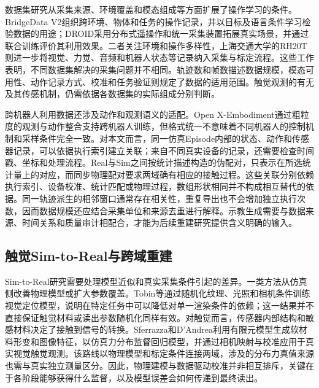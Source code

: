 数据集研究从采集来源、环境覆盖和模态组成等方面扩展了操作学习的条件。BridgeData V2组织跨环境、物体和任务的操作记录，并以目标及语言条件学习检验数据的用途\cite{walke2023bridgedata}；DROID采用分布式遥操作和统一采集装置拓展真实场景，并通过联合训练评价其利用效果\cite{khazatsky2024droid}。二者关注环境和操作多样性，上海交通大学的RH20T则进一步将视觉、力觉、音频和机器人状态等记录纳入采集与标定流程\cite{fang2024rh20t}。这些工作表明，不同数据集解决的采集问题并不相同。轨迹数和帧数描述数据规模，模态可用性、动作记录方式、校准和任务验证则规定了数据的适用范围。触觉观测的有无及其传感机制，仍需依据各数据集的实际组成分别判断。

跨机器人利用数据还涉及动作和观测语义的适配。Open X-Embodiment通过粗粒度的观测与动作整合支持跨机器人训练，但格式统一不意味着不同机器人的控制机制和采样条件完全一致\cite{openx2024embodiment}。对本文而言，同一仿真Episode内部的状态、动作和传感器记录，可以依据执行索引建立关联；来自不同真实设备的记录，还需要检查时间戳、坐标和处理流程。Real与Sim之间按统计描述构造的伪配对，只表示在所选统计量上的对应，而同步物理配对要求两域确有相应的接触过程。这些关联分别依赖执行索引、设备校准、统计匹配或物理过程，数组形状相同并不构成相互替代的依据。同一轨迹派生的相邻窗口通常存在相关性，重复导出也不会增加独立执行次数，因而数据规模还应结合采集单位和来源去重进行解释。示教生成需要与数据来源、时间关系和质量审计相配合，才能为后续重建研究提供含义明确的输入。

\subsection{触觉Sim-to-Real与跨域重建}
\label{subsec:tactile_sim_to_real}

Sim-to-Real研究需要处理模型近似和真实采集条件引起的差异。一类方法从仿真侧改善物理模型或扩大参数覆盖。Tobin等通过随机化纹理、光照和相机条件训练视觉定位模型，说明在特定任务中可以降低对单一渲染条件的依赖\cite{tobin2017randomization}；这一结果并不直接保证触觉材料或读出参数随机化同样有效。对触觉而言，传感器内部结构和敏感材料决定了接触到信号的转换。Sferrazza和D'Andrea利用有限元模型生成软材料形变和图像特征，以仿真力分布监督回归模型，并通过相机映射与校准应用于真实视觉触觉观测\cite{sferrazza2022simtoreal}。该路线以物理模型和标定条件连接两域，涉及的分布力真值来源也需与真实独立测量区分。因此，物理建模与数据驱动校准并非相互排斥，关键在于各阶段能够获得什么监督，以及模型误差会如何传递到最终读出。

